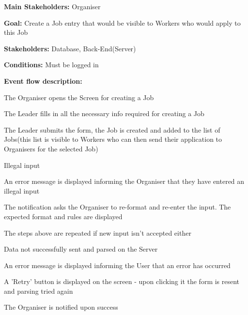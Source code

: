 				\noindent {}
				\begin{packed_item}
					\item \textbf{Main Stakeholders:} Organiser
					\item \textbf{Goal:} Create a Job entry that would be visible to Workers who would apply to this Job
					\item \textbf{Stakeholders: } Database, Back-End(Server)
					\item \textbf{Conditions: } Must be logged in
					\item \textbf{Event flow description: }
					\begin{packed_enum}
						\item The Organiser opens the Screen for creating a Job
						\item The Leader fills in all the necessary info required for creating a Job
						\item The Leader submits the form, the Job is created and added to the list of Jobs(this list is visible to Workers who can then send their application to Organisers for the selected Job)
					\end{packed_enum}
					
					\begin{packed_item}
						\item[2.a] Illegal input
						\item[] \begin{packed_enum}
							\item An error message is displayed informing the Organiser that they have entered an illegal input
							\item The notification asks the Organiser to re-format and re-enter the input. The expected format and rules are displayed
							\item The steps above are repeated if new input isn't accepted either
						\end{packed_enum}
						
						\item[3.a] Data not successfully sent and parsed on the Server
						\item[] \begin{packed_enum}
							\item An error message is displayed informing the User that an error has occurred
							\item A 'Retry' button is displayed on the screen - upon clicking it the form is resent and parsing tried again
							\item The Organiser is notified upon success
						\end{packed_enum}
						
					\end{packed_item}
				\end{packed_item}
			
